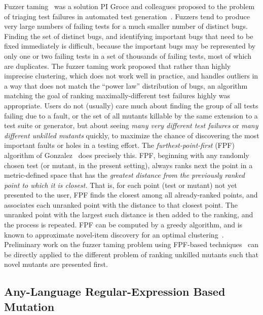 Fuzzer taming~\cite{PLDI13} was a solution PI Groce and colleagues proposed to the problem
of triaging test failures in automated test generation~\cite{SemCrash}.  
Fuzzers tend to produce very large numbers of failing tests for a much
smaller number of distinct bugs.  Finding the set of distinct bugs,
and identifying important bugs that need to be fixed immediately is
difficult, because the important bugs may be represented by only one
or two failing tests in a set of thousands of failing tests, most of
which are duplicates.  The fuzzer taming work proposed that rather than highly imprecise
clustering, which does not work well in practice, and handles outliers
in a way that does not match the ``power law'' distribution of bugs, an
algorithm matching the goal of ranking maximally-different test
failures highly was appropriate.  Users do not (usually) care much
about finding the group of all tests failing due to a fault, or the
set of all mutants killable by the same extension to a test suite or
generator, but about seeing \emph{many very different test failures} or \emph{many
  different unkilled mutants} quickly, to maximize the chance of
discovering the most important faults or holes in a testing effort.
The \emph{furthest-point-first} (FPF) algorithm of
Gonzalez~\cite{Gonzalez85} does precisely this.  FPF, beginning with
any randomly chosen test (or mutant, in the present setting), always ranks
next the point in a metric-defined space that has the \emph{greatest
  distance from the previously ranked point to which it is closest.}
That is, for each point (test or mutant) not yet presented to the
user, FPF finds the closest among all already-ranked points, and
associates each unranked point with the distance to that closest
point.  The unranked point with the largest such distance is then
added to the ranking, and the process is repeated.  FPF can be
computed by a greedy algorithm, and is known to approximate novel-item
discovery for an optimal clustering~\cite{Gonzalez85}.  Preliminary work on the fuzzer taming problem using FPF-based
techniques~\cite{PLDI13,distMut} can be directly applied
to the different problem of ranking
unkilled mutants such that novel mutants are presented first.  %

\subsection{Any-Language Regular-Expression Based Mutation}

